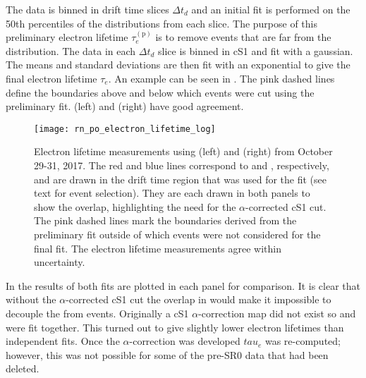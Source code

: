 The data is binned in drift time slices $\Delta t_d$ and an initial fit is performed on the 50th percentiles of the \stwob distributions
from each slice.  The purpose of this preliminary electron lifetime $\tau_e^{(\mathrm{p})}$ is to remove events that are far from the
distribution.  The data
in each $\Delta t_d$ slice is binned in cS1 and fit with a gaussian.  The means and standard deviations are then fit
with an exponential to give the final electron lifetime $\tau_e$.  An example can be seen in
.  The pink dashed lines define the boundaries above and below which
events were cut using the preliminary fit.   (left) and  (right) have good agreement.

\begin{figure}
\centering
\texttt{[image: rn\_po\_electron\_lifetime\_log]}
\caption[Electron lifetime measurements using  (left) and  (right) from October 29-31, 2017.]{Electron lifetime
measurements using  (left) and  (right) from October 29-31, 2017.  The red and blue
lines correspond to  and , respectively, and are drawn in the drift time region that was used for the fit (see
text for event selection).  They are each drawn in both panels to show the \stwob overlap, highlighting the need for the
$\alpha$-corrected cS1 cut.  The pink dashed lines mark the boundaries derived from the preliminary fit outside of which events were not
considered for the final fit.  The electron lifetime measurements agree within uncertainty.}
\label{fig:electron_lifetimes_measurement_alphas_elifetime}
\end{figure}

In  the results of both fits are plotted in each panel for comparison.  It is
clear that without the $\alpha$-corrected cS1 cut the overlap in \stwob would make it impossible to decouple the  from
 events.  Originally a cS1 $\alpha$-correction map did not exist so  and  were fit together.  This
turned out to give slightly lower electron lifetimes than independent fits.  Once
the $\alpha$-correction was developed $tau_e$ was re-computed; however, this was not possible for some of the pre-SR0 data that had been
deleted.

